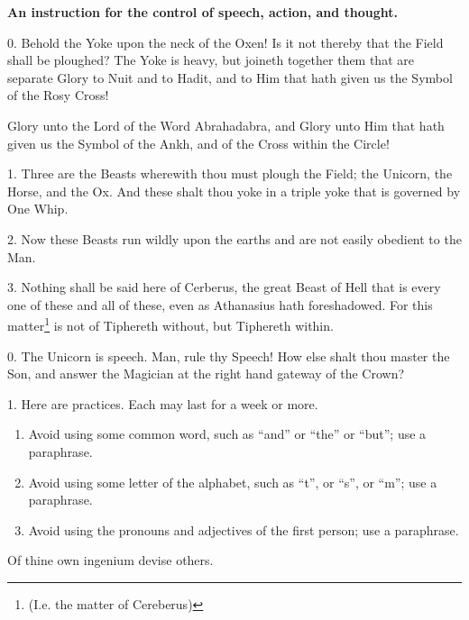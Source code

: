 
\textbf{An instruction for the control of speech, action, and thought.}

0. Behold the Yoke upon the neck of the Oxen! Is it not thereby that the Field shall be ploughed? The Yoke is heavy, but joineth together them that are separate \textemdash{} Glory to Nuit and to Hadit, and to Him that hath given us the Symbol of the Rosy Cross!

Glory unto the Lord of the Word Abrahadabra, and Glory unto Him that hath given us the Symbol of the Ankh, and of the Cross within the Circle!

1. Three are the Beasts wherewith thou must plough the Field; the Unicorn, the Horse, and the Ox. And these shalt thou yoke in a triple yoke that is governed by One Whip.

2. Now these Beasts run wildly upon the earths and are not easily obedient to the Man.

3. Nothing shall be said here of Cerberus, the great Beast of Hell that is every one of these and all of these, even as Athanasius hath foreshadowed. For this matter\footnote{(I.e. the matter of Cereberus)} is not of Tiphereth without, but Tiphereth within.

0. The Unicorn is speech. Man, rule thy Speech! How else shalt thou master the Son, and answer the Magician at the right hand gateway of the Crown?

1. Here are practices. Each may last for a week or more.
\begin{enumerate}[label=\greek*.]
\item Avoid using some common word, such as \enquote{and} or \enquote{the} or \enquote{but}; use a paraphrase.

\item Avoid using some letter of the alphabet, such as \enquote{t}, or \enquote{s}, or \enquote{m}; use a paraphrase.

\item Avoid using the pronouns and adjectives of the first person; use a paraphrase.
\end{enumerate}
Of thine own ingenium devise others.

